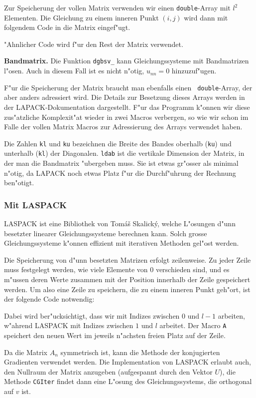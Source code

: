 Zur Speicherung der vollen Matrix verwenden wir einen {\tt double}-Array mit $l^2$ Elementen.
Die Gleichung zu einem inneren Punkt $(i,j)$ wird dann mit folgendem Code 
in die Matrix eingef"ugt.

"Ahnlicher Code wird f"ur den Rest der Matrix verwendet.

\medskip
{\parindent0pt
{\bf Bandmatrix.}}
Die Funktion {\tt dgbsv\_} kann Gleichungssysteme mit Bandmatrizen
l"osen. Auch in diesem Fall ist es nicht n"otig, $u_{nn}=0$ hinzuzuf"ugen.

F"ur die Speicherung der Matrix braucht man ebenfalls einen {\tt
double}-Array, der aber anders adressiert wird. Die Details zur Besetzung
dieses Arrays werden in der LAPACK-Dokumentation dargestellt. F"ur das
Programm k"onnen wir diese zus"atzliche Komplexit"at wieder in zwei
Macros verbergen, so wie wir schon im Falle der vollen Matrix Macros
zur Adressierung des Arrays verwendet haben.

Die Zahlen {\tt kl} und {\tt ku} bezeichnen die Breite des Bandes oberhalb
({\tt ku}) und unterhalb ({\tt kl}) der Diagonalen. {\tt ldab} ist die
vertikale Dimension der Matrix, in der man die Bandmatrix "ubergeben
muss. Sie ist etwas gr"osser als minimal n"otig, da LAPACK noch etwas
Platz f"ur die Durchf"uhrung der Rechnung ben"otigt.

\subsubsection{Mit LASPACK}
LASPACK ist eine Bibliothek von Tom\'a\v s Skalick\'y, welche L"osungen
d"unn besetzter linearer Gleichungssysteme berechnen kann. Solch grosse
Gleichungssysteme k"onnen effizient mit iterativen Methoden gel"ost
werden.

Die Speicherung von d"unn besetzten Matrizen erfolgt zeilenweise. Zu
jeder Zeile muss festgelegt werden, wie viele Elemente von 0 verschieden
sind, und es m"ussen deren Werte zusammen mit der Position innerhalb
der Zeile gespeichert werden.  Um also eine Zeile zu speichern, die zu
einem inneren Punkt geh"ort, ist der folgende Code notwendig:

Dabei wird ber"ucksichtigt, dass wir mit Indizes zwischen $0$ und $l-1$
arbeiten, w"ahrend LASPACK mit Indizes zwischen $1$ und $l$ arbeitet. Der
Macro {\tt A} speichert den neuen Wert im jeweils n"achsten freien Platz
auf der Zeile.

Da die Matrix $A_n$ symmetrisch ist, kann die Methode der konjugierten
Gradienten verwendet werden.  Die Implementation von LASPACK erlaubt
auch, den Nullraum der Matrix anzugeben (aufgespannt durch den Vektor $U$),
die Methode {\tt CGIter} findet dann eine L"osung
des Gleichungssystems, die orthogonal auf $v$ ist.

